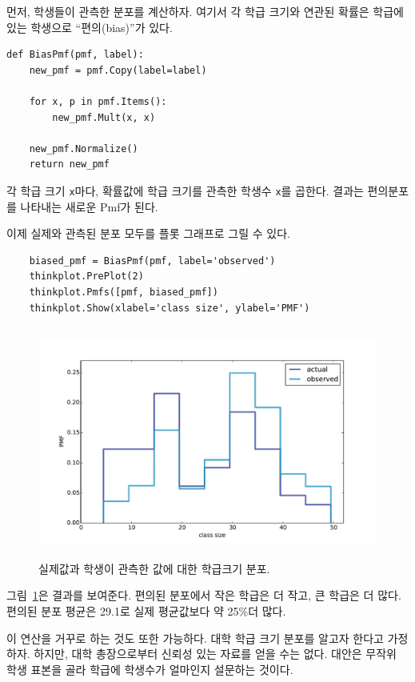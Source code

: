 먼저, 학생들이 관측한 분포를 계산하자. 여기서 각 학급 크기와 연관된 확률은 학급에 있는 학생으로 ``편의(bias)''가 있다.


\begin{verbatim}
def BiasPmf(pmf, label):
    new_pmf = pmf.Copy(label=label)

    for x, p in pmf.Items():
        new_pmf.Mult(x, x)
        
    new_pmf.Normalize()
    return new_pmf
\end{verbatim}

각 학급 크기 {\tt x}마다, 확률값에 학급 크기를 관측한 학생수 {\tt x}를 곱한다. 결과는 편의분포를 나타내는 새로운 Pmf가 된다.

이제 실제와 관측된 분포 모두를 플롯 그래프로 그릴 수 있다.

\begin{verbatim}
    biased_pmf = BiasPmf(pmf, label='observed')
    thinkplot.PrePlot(2)
    thinkplot.Pmfs([pmf, biased_pmf])
    thinkplot.Show(xlabel='class size', ylabel='PMF')
\end{verbatim}

\begin{figure}
\centerline{\includegraphics[height=3.0in]{figs/class_size1.pdf}}
\caption{실제값과 학생이 관측한 값에 대한 학급크기 분포.}
\label{class_size1}
\end{figure}

그림~\ref{class_size1}은 결과를 보여준다. 편의된 분포에서 작은 학급은 더 작고, 큰 학급은 더 많다. 편의된 분포 평균은 29.1로 실제 평균값보다 약 25\%더 많다. 

이 연산을 거꾸로 하는 것도 또한 가능하다. 대학 학급 크기 분포를 알고자 한다고 가정하자. 하지만, 대학 총장으로부터 신뢰성 있는 자료를 얻을 수는 없다. 대안은 무작위 학생 표본을 골라 학급에 학생수가 얼마인지 설문하는 것이다.

